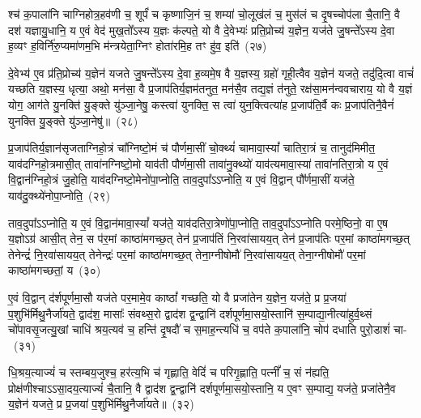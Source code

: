 श्च॑ क॒पाला॑नि चाग्निहोत्र॒हव॑णी च॒ शूर्पं॑ च कृष्णाजि॒नं च॒ शम्या॑ चो॒लूख॑लं च॒ मुस॑लं च दृ॒षच्चोप॑ला चै॒तानि॒ वै दश॑ यज्ञायु॒धानि॒ य ए॒वं वेद॑ मुख॒तो᳚\-ऽस्य य॒ज्ञः क॑ल्पते॒ यो वै दे॒वेभ्यः॑ प्रति॒प्रोच्य॑ य॒ज्ञेन॒ यज॑ते जु॒षन्ते᳚\-ऽस्य दे॒वा ह॒व्यꣳ ह॒विर्नि॑रु॒प्यमा॑णम॒भि म॑न्त्रयेता॒ग्निꣳ होता॑रमि॒ह तꣳ हु॑व॒ इति॑~(२७)

दे॒वेभ्य॑ ए॒व प्र॑ति॒प्रोच्य॑ य॒ज्ञेन॑ यजते जु॒षन्ते᳚\-ऽस्य दे॒वा ह॒व्यमे॒ष वै य॒ज्ञस्य॒ ग्रहो॑ गृही॒त्वैव य॒ज्ञेन॑ यजते॒ तदु॑दि॒त्वा वाचं॑ यच्छति य॒ज्ञस्य॒ धृत्या॒ अथो॒ मन॑सा॒ वै प्र॒जा\-प॑तिर्य॒ज्ञम॑तनुत॒ मन॑सै॒व तद्य॒ज्ञं त॑नुते॒ रक्ष॑सा॒मन॑न्ववचाराय॒ यो वै य॒ज्ञं योग॒ आग॑ते यु॒नक्ति॑ यु॒ङ्क्ते यु॑ञ्जा॒नेषु॒ कस्त्वा॑ युनक्ति॒ स त्वा॑ युन॒क्त्वित्या॑ह प्र॒जा\-प॑ति॒र्वै कः प्र॒जा\-प॑तिनै॒वैनं॑ युनक्ति यु॒ङ्क्ते यु॑ञ्जा॒नेषु॑॥~(२८)

{\anuvakamend[{वै मनः॒ स्फ्य इति॑ युन॒क्त्वेका॑\-दश च}]}%

प्र॒जा\-प॑तिर्य॒ज्ञान॑सृजता\-ग्निहो॒त्रं चा᳚ग्निष्टो॒मं च॑ पौर्णमा॒सीं चो॒क्थ्यं॑ चामावा॒स्यां᳚ चातिरा॒त्रं च॒ तानुद॑मिमीत॒ याव॑दग्निहो॒त्रमासी॒त् तावा॑नग्निष्टो॒मो याव॑ती पौर्णमा॒सी तावा॑नु॒क्थ्यो॑ याव॑त्यमावा॒स्या॑ तावा॑नतिरा॒त्रो य ए॒वं वि॒द्वान॑ग्निहो॒त्रं जु॒होति॒ याव॑दग्निष्टो॒मेनो॑पा॒प्नोति॒ ताव॒दुपा᳚\-ऽ\-ऽप्नोति॒ य ए॒वं वि॒द्वान् पौ᳚र्णमा॒सीं यज॑ते॒ याव॑दु॒क्थ्ये॑नो\-पा॒प्नोति॒~(२९)

ताव॒दुपा᳚\-ऽ\-ऽप्नोति॒ य ए॒वं वि॒द्वान॑मावा॒स्यां᳚ यज॑ते॒ याव॑दतिरा॒त्रेणो॑पा॒प्नोति॒ ताव॒दुपा᳚\-ऽ\-ऽप्नोति परमे॒ष्ठिनो॒ वा ए॒ष य॒ज्ञो\-ऽग्र॑ आसी॒त् तेन॒ स प॑र॒मां काष्ठा॑मगच्छ॒त् तेन॑ प्र॒जा\-प॑तिं नि॒रवा॑सायय॒त् तेन॑ प्र॒जा\-प॑तिः पर॒मां काष्ठा॑मगच्छ॒त् तेनेन्द्रं॑ नि॒रवा॑सायय॒त् तेनेन्द्रः॑ पर॒मां काष्ठा॑मगच्छ॒त् तेना॒ग्नी\-षोमौ॑ नि॒रवा॑सायय॒त् तेना॒ग्नी\-षोमौ॑ पर॒मां काष्ठा॑मगच्छतां॒ य~(३०)

ए॒वं वि॒द्वान् द॑र्\mbox{}शपूर्णमा॒सौ यज॑ते पर॒मामे॒व काष्ठां᳚ गच्छति॒ यो वै प्रजा॑तेन य॒ज्ञेन॒ यज॑ते॒ प्र प्र॒जया॑ प॒शुभि॑र्मिथु॒नैर्जा॑यते॒ द्वाद॑श॒ मासाः᳚ संवथ्स॒रो द्वाद॑श द्व॒न्द्वानि॑ दर्\mbox{}श\-पूर्ण\-मा॒सयो॒स्तानि॑ स॒म्पाद्या॒नीत्या॑हुर्व॒थ्सं चो॑पावसृ॒जत्यु॒खां चाधि॑ श्रय॒त्यव॑ च॒ हन्ति॑ दृ॒षदौ॑ च स॒माह॒न्त्यधि॑ च॒ वप॑ते क॒पाला॑नि॒ चोप॑ दधाति पुरो॒डाशं॑ चा-~(३१)

धि॒श्रय॒त्याज्यं॑ च स्तम्बय॒जुश्च॒ हर॑त्य॒भि च॑ गृह्णाति॒ वेदिं॑ च परिगृ॒ह्णाति॒ पत्नीं᳚ च॒ सं न॑ह्यति॒ प्रोक्ष॑णीश्चा\-ऽ\-ऽसा॒दय॒त्याज्यं॑ चै॒तानि॒ वै द्वाद॑श द्व॒न्द्वानि॑ दर्\mbox{}श\-पूर्ण\-मा॒सयो॒स्तानि॒ य ए॒वꣳ स॒म्पाद्य॒ यज॑ते॒ प्रजा॑तेनै॒व य॒ज्ञेन॑ यजते॒ प्र प्र॒जया॑ प॒शुभि॑र्मिथु॒नैर्जा॑यते॥~(३२)

